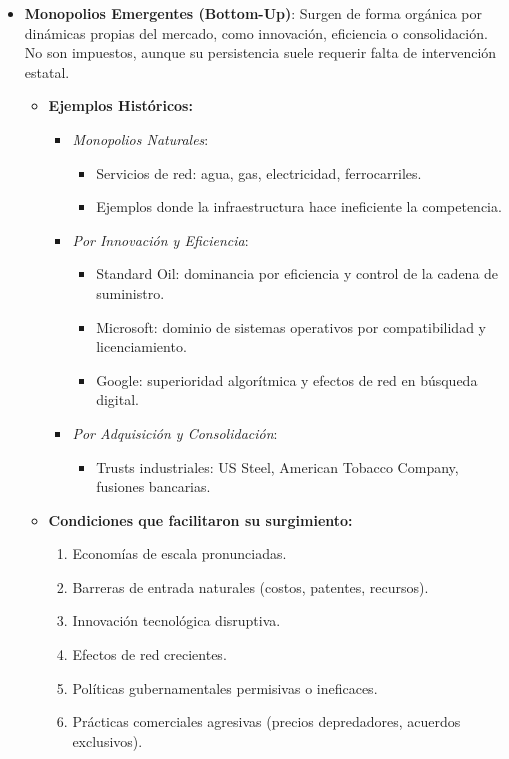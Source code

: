 \documentclass[a4paper,12pt]{article}
\begin{document}
\begin{itemize}
    \item \textbf{Monopolios Emergentes (Bottom-Up)}:
    Surgen de forma orgánica por dinámicas propias del mercado, como innovación, eficiencia o consolidación. No son impuestos, aunque su persistencia suele requerir falta de intervención estatal.

    \begin{itemize}
        \item \textbf{Ejemplos Históricos:}
        \begin{itemize}
            \item \textit{Monopolios Naturales}:
            \begin{itemize}
                \item Servicios de red: agua, gas, electricidad, ferrocarriles.
                \item Ejemplos donde la infraestructura hace ineficiente la competencia.
            \end{itemize}
            \item \textit{Por Innovación y Eficiencia}:
            \begin{itemize}
                \item Standard Oil: dominancia por eficiencia y control de la cadena de suministro.
                \item Microsoft: dominio de sistemas operativos por compatibilidad y licenciamiento.
                \item Google: superioridad algorítmica y efectos de red en búsqueda digital.
            \end{itemize}
            \item \textit{Por Adquisición y Consolidación}:
            \begin{itemize}
                \item Trusts industriales: US Steel, American Tobacco Company, fusiones bancarias.
            \end{itemize}
        \end{itemize}

        \item \textbf{Condiciones que facilitaron su surgimiento:}
        \begin{enumerate}
            \item Economías de escala pronunciadas.
            \item Barreras de entrada naturales (costos, patentes, recursos).
            \item Innovación tecnológica disruptiva.
            \item Efectos de red crecientes.
            \item Políticas gubernamentales permisivas o ineficaces.
            \item Prácticas comerciales agresivas (precios depredadores, acuerdos exclusivos).
        \end{enumerate}
    \end{itemize}
\end{itemize}
\end{document}
